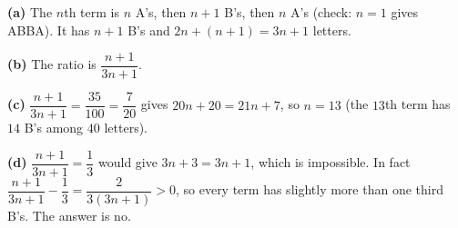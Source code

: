 \textbf{(a)} The $n$th term is $n$ A's, then $n+1$ B's, then $n$ A's (check: $n=1$ gives ABBA). It has $n+1$ B's and $2n+(n+1)=3n+1$ letters.

\textbf{(b)} The ratio is $\boxed{\dfrac{n+1}{3n+1}}$.

\textbf{(c)} $\dfrac{n+1}{3n+1}=\dfrac{35}{100}=\dfrac{7}{20}$ gives $20n+20=21n+7$, so $n=\boxed{13}$ (the $13$th term has $14$ B's among $40$ letters).

\textbf{(d)} $\dfrac{n+1}{3n+1}=\dfrac{1}{3}$ would give $3n+3=3n+1$, which is impossible. In fact $\dfrac{n+1}{3n+1}-\dfrac{1}{3}=\dfrac{2}{3(3n+1)}>0$, so every term has slightly more than one third B's. The answer is $\boxed{\text{no}}$.
